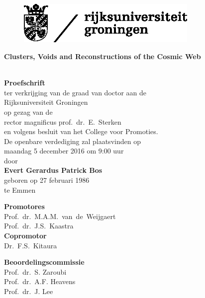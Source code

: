 
\pagestyle{empty}
\begin{large}
\begin{center}

\begin{figure}[t]
\includegraphics[width=8.68cm]{ch_frontandback/rugr_logonl_zwart_rgb.eps}
\end{figure}
\vspace*{0.75cm}

{\bf \huge \centering Clusters, Voids and Reconstructions of the Cosmic Web \strut} \\ 

\bigskip
\medskip
{\Large \textbf{Proefschrift}}\\
\bigskip
ter verkrijging van de graad van doctor aan de\\
Rijksuniversiteit Groningen\\
op gezag van de\\
rector magnificus prof.\ dr.\ E.\ Sterken\\
en volgens besluit van het College voor Promoties.\\
\medskip
De openbare verdediging zal plaatsvinden op \\
\medskip
maandag 5 december 2016 om 9:00 uur\\
\bigskip
door\\
\bigskip
{\Large \bf Evert Gerardus Patrick Bos}\\
\medskip
geboren op 27 februari 1986\\
te Emmen
\end{center}
\end{large}
\pagebreak

\begin{large}
\noindent\textbf{Promotores}\\
Prof.~dr.~M.A.M.~van~de~Weijgaert\\
Prof.~dr.~J.S.~Kaastra\\

\bigskip
\noindent\textbf{Copromotor}\\
Dr.~F.S.~Kitaura\\
\bigskip

\noindent\textbf{Beoordelingscommissie}\\
Prof.~dr.~S. Zaroubi\\
Prof.~dr.~A.F. Heavens\\
Prof.~dr.~J. Lee\\

\vfill

\end{large}
\pagebreak
